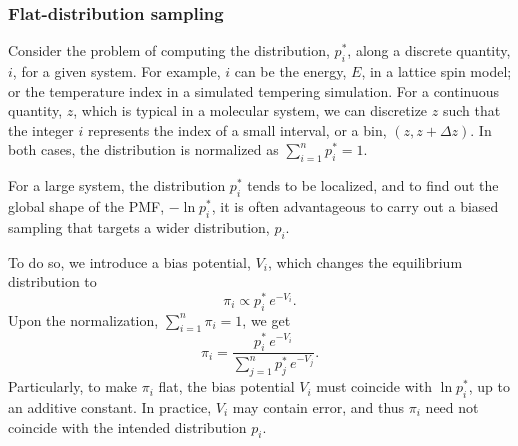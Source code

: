 \documentclass[reprint, floatfix]{revtex4-1}
\begin{document}
\subsubsection{\label{sec:FDS}
Flat-distribution sampling}



Consider the problem of computing
the distribution, $p^*_i$,
along a discrete quantity, $i$,
for a given system.
%
%
For example, $i$ can be the energy, $E$,
in a lattice spin model; or the temperature index
in a simulated tempering simulation\cite{
marinari1992, lyubartsev1992}.
%
For a continuous quantity, $z$,
which is typical in a molecular system,
we can discretize $z$
such that the integer $i$ represents
the index of a small interval, or a bin,
$(z, z + \Delta z)$.
%
In both cases,
the distribution is normalized as
$\sum_{i = 1}^n p^*_i = 1$.



For a large system,
the distribution $p^*_i$ tends to
be localized,
%
and to find out the global shape
of the PMF, $-\ln p^*_i$,
it is often advantageous to carry out
a biased sampling that targets
a wider distribution, $p_i$.
%



To do so, we introduce a bias potential, $V_i$,
which changes the equilibrium distribution to
%
\begin{equation}
  \pi_i \propto p^*_i \, e^{-V_i}.
  \label{eq:pi_p_phi1}
\end{equation}
%
Upon the normalization,
$\sum_{i = 1}^n \pi_i = 1$,
we get
%
\begin{equation}
  \pi_i
  =
  \frac{                p^*_i \, e^{-V_i} }
       { \sum_{j = 1}^n p^*_j \, e^{-V_j} }
  .
  \label{eq:pi_p_phi}
\end{equation}
%
Particularly,
to make $\pi_i$ flat,
the bias potential $V_i$
must coincide with $\ln p^*_i$,
up to an additive constant.
%
In practice, $V_i$ may contain error,
and thus $\pi_i$ need not
coincide with the intended distribution $p_i$.
\end{document}
